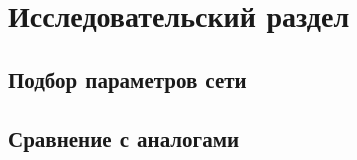 \chapter{Исследовательский раздел}

\section{Подбор параметров сети}
\section{Сравнение с аналогами}


%		
%		
%		
%		
%		
%		
%		
%		
